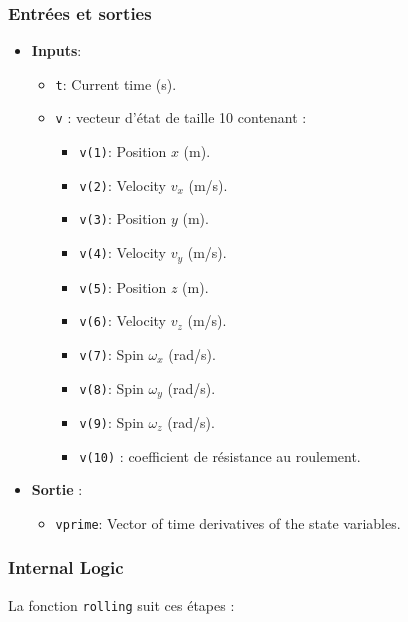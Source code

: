 \documentclass[10pt,a4paper]{report}
\begin{document}
\subsubsection{Entrées et sorties}
\begin{itemize}
    \item \textbf{Inputs}:
    \begin{itemize}
        \item \texttt{t}: Current time (s).
        \item \texttt{v} : vecteur d'état de taille 10 contenant :
        \begin{itemize}
            \item \texttt{v(1)}: Position \(x\) (m).
            \item \texttt{v(2)}: Velocity \(v_x\) (m/s).
            \item \texttt{v(3)}: Position \(y\) (m).
            \item \texttt{v(4)}: Velocity \(v_y\) (m/s).
            \item \texttt{v(5)}: Position \(z\) (m).
            \item \texttt{v(6)}: Velocity \(v_z\) (m/s).
            \item \texttt{v(7)}: Spin \(\omega_x\) (rad/s).
            \item \texttt{v(8)}: Spin \(\omega_y\) (rad/s).
            \item \texttt{v(9)}: Spin \(\omega_z\) (rad/s).
            \item \texttt{v(10)} : coefficient de résistance au roulement.
        \end{itemize}
    \end{itemize}
    \item \textbf{Sortie} :
    \begin{itemize}
        \item \texttt{vprime}: Vector of time derivatives of the state variables.
    \end{itemize}
\end{itemize}

\subsubsection{Internal Logic}
La fonction \texttt{rolling} suit ces étapes :
\end{document}
